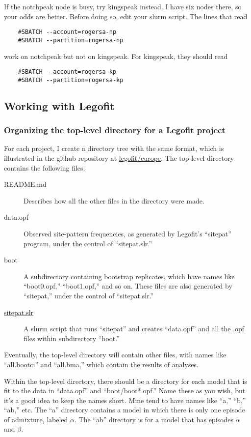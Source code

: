 \documentclass[11pt]{article}
\begin{document}
If the notchpeak node is busy, try kingspeak instead. I have six nodes
there, so your odds are better. Before doing so, edit your slurm
script. The lines that read
\begin{verbatim}
    #SBATCH --account=rogersa-np
    #SBATCH --partition=rogersa-np
\end{verbatim}
work on notchpeak but not on kingspeak. For kingspeak, they should read
\begin{verbatim}
    #SBATCH --account=rogersa-kp
    #SBATCH --partition=rogersa-kp
\end{verbatim}

\subsection{Working with Legofit}
\subsubsection{Organizing the top-level directory for a Legofit project}
For each project, I create a directory tree with the same format,
which is illustrated in the github repository at
\href{https://github.com/alanrogers/agar22/tree/main/legofit/europe}{legofit/europe}.
The top-level directory contains the following files:
\begin{description}
\item[README.md]
Describes how all the other files in the directory were made.

\item[data.opf]
Observed site-pattern frequencies, as generated by Legofit's
``sitepat'' program, under the control of ``sitepat.slr.''

\item[boot]
A subdirectory containing bootstrap replicates, which have names
like ``boot0.opf,'' ``boot1.opf,'' and so on. These files are also
generated by ``sitepat,'' under the control of ``sitepat.slr.''

\item[\href{sitepat.slr.html}{sitepat.slr}]
A slurm script that runs ``sitepat'' and creates ``data.opf'' and all
the .opf files within subdirectory ``boot.''
\end{description}
Eventually, the top-level directory will contain other files, with
names like ``all.bootci'' and ``all.bma,'' which contain the results
of analyses.

Within the top-level directory, there should be a directory for each
model that is fit to the data in ``data.opf'' and ``boot/boot*.opf.''
Name these as you wish, but it's a good idea to keep the names
short. Mine tend to have names like ``a,'' ``b,'' ``ab,'' etc. The
``a'' directory contains a model in which there is only one episode of
admixture, labeled $\alpha$. The ``ab'' directory is for a model that
has episodes $\alpha$ and $\beta$.
\end{document}
